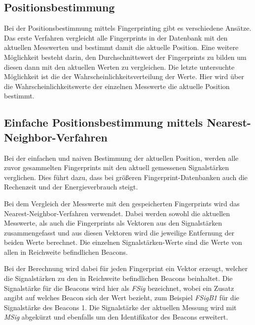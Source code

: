 
\subsection{Positionsbestimmung}
\label{sec:implementation:fingerprinting:positioning}
Bei der Positionsbestimmung mittels Fingerprinting gibt es verschiedene Ansätze.
Das erste Verfahren vergleicht alle Fingerprints in der Datenbank mit den aktuellen Messwerten und bestimmt damit die aktuelle Position.
Eine weitere Möglichkeit besteht darin, den Durchschnittswert der Fingerprints zu bilden um diesen dann mit den aktuellen Werten zu vergleichen.
Die letzte untersuchte Möglichkeit ist die der Wahrscheinlichkeitsverteilung der Werte. Hier wird über die Wahrscheinlichkeitswerte der einzelnen Messwerte die aktuelle Position bestimmt.

\subsection{Einfache Positionsbestimmung mittels Nearest-Neighbor-Verfahren}
\label{sec:implementation:fingerprinting:positioning:naiv}
Bei der einfachen und naiven Bestimmung der aktuellen Position, werden alle zuvor gesammelten Fingerprints mit den aktuell gemessenen Signalstärken verglichen. Dies führt dazu, dass bei größeren Fingerprint-Datenbanken auch die Rechenzeit und der Energieverbrauch steigt. 

Bei dem Vergleich der Messwerte mit den gespeicherten Fingerprints wird das Nearest-Neighbor-Verfahren verwendet. Dabei werden sowohl die aktuellen Messwerte, als auch die Fingerprints als Vektoren aus den Signalstärken zusammengefasst und aus diesen Vektoren wird die jeweilige Entfernung der beiden Werte berechnet. Die einzelnen Signalstärken-Werte sind die Werte von allen in Reichweite befindlichen Beacons.

Bei der Berechnung wird dabei für jeden Fingerprint ein Vektor erzeugt, welcher die Signalstärken zu den in Reichweite befindlichen Beacons beinhaltet.
Die Signalstärke für die Beacons wird hier als \emph{FSig} bezeichnet, wobei ein Zusatz angibt auf welches Beacon sich der Wert bezieht, zum Beispiel \emph{FSigB1} für die Signalstärke des Beacons 1.
Die Signalstärke der aktuellen Messung wird mit \emph{MSig} abgekürzt und ebenfalls um den Identifikator des Beacons erweitert.


